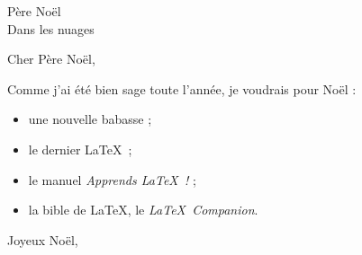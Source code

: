 \documentclass[NF]{scrlttr2}
\begin{document}
\begin{letter}{Père Noël \\ Dans les nuages}

\opening{Cher Père Noël,}

Comme j'ai été bien sage toute l'année, je voudrais
pour Noël :

\begin{itemize}

\item une nouvelle babasse ;

\item le dernier \LaTeX\ ;

\item le manuel \textit{Apprends \LaTeX\ !} ;

\item la bible de \LaTeX, le \textit{\LaTeX\ Companion}.

\end{itemize}

\closing{Joyeux Noël,}

\end{letter}
\end{document}
